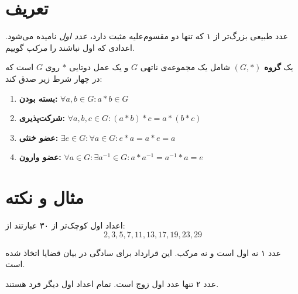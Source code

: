 \documentclass{matinbook}
\begin{document}
\section{تعریف}
\label{sec:definition}

\begin{definition}
    عدد طبیعی بزرگ‌تر از ۱ که تنها دو مقسوم‌علیه مثبت دارد،
    \emph{عدد اول} نامیده می‌شود. اعدادی که اول نباشند را
    \emph{مرکب} گوییم.
    \label{def:prime}
\end{definition}

\begin{definition}[گروه]
    یک \textbf{گروه} $(G, *)$ شامل یک مجموعه‌ی ناتهی $G$
    و یک عمل دوتایی $*$ روی $G$ است که در چهار شرط زیر
    صدق کند:
    \begin{enumerate}
        \item \textbf{بسته بودن:} $\forall a, b \in G: a * b \in G$
        \item \textbf{شرکت‌پذیری:} $\forall a, b, c \in G: (a * b) * c = a * (b * c)$
        \item \textbf{عضو خنثی:} $\exists e \in G: \forall a \in G: e * a = a * e = a$
        \item \textbf{عضو وارون:} $\forall a \in G: \exists a^{-1} \in G: a * a^{-1} = a^{-1} * a = e$
    \end{enumerate}
    \label{def:group}
\end{definition}

\section{مثال و نکته}
\label{sec:example-remark}

\begin{example}
    اعداد اول کوچک‌تر از ۳۰ عبارتند از:
    \[
    2, 3, 5, 7, 11, 13, 17, 19, 23, 29
    \]
    \label{ex:small-primes}
\end{example}

\begin{remark}[نکته]
    عدد ۱ نه اول است و نه مرکب. این قرارداد برای سادگی
    در بیان قضایا اتخاذ شده است.
    \label{rem:one-not-prime}
\end{remark}

\begin{remark}
    عدد ۲ تنها عدد اول زوج است. تمام اعداد اول دیگر فرد
    هستند.
    \label{rem:two-is-special}
\end{remark}
\end{document}
